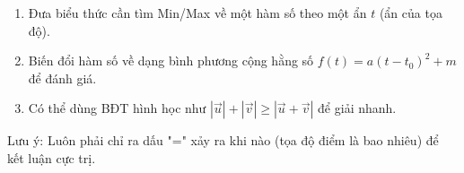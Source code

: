 \begin{enumerate}
\item Đưa biểu thức cần tìm Min/Max về một hàm số theo một ẩn $t$ (ẩn của tọa độ).
\item Biến đổi hàm số về dạng bình phương cộng hằng số $f(t) = a(t - t_0)^2 + m$ để đánh giá.
\item Có thể dùng BĐT hình học như $|\overrightarrow{u}| + |\overrightarrow{v}| \ge |\overrightarrow{u} + \overrightarrow{v}|$ để giải nhanh.
\end{enumerate}
Lưu ý: Luôn phải chỉ ra dấu "=" xảy ra khi nào (tọa độ điểm là bao nhiêu) để kết luận cực trị.
